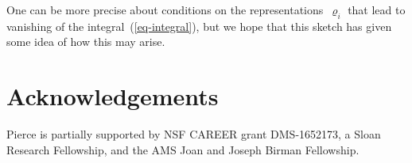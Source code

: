 \documentclass[oneside,11pt]{amsart}
\renewcommand{\rho}{\varrho}
\begin{document}
One can be more precise about conditions on the
representations~$\rho_i$ that lead to vanishing of the
integral~(\ref{eq-integral}), but we hope that this sketch has given
some idea of how this may arise.

\section*{Acknowledgements}
Pierce is partially supported by NSF   CAREER grant DMS-1652173, a Sloan Research Fellowship, and the AMS Joan and Joseph Birman Fellowship.   




\label{endofproposal}
\end{document}
